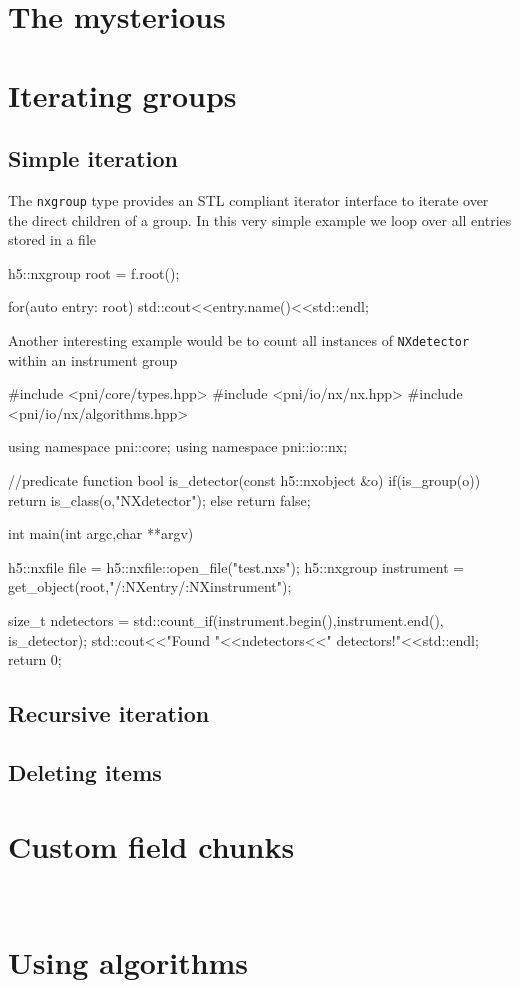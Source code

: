 \section{The mysterious \nxobject}\label{section:nxobject}

\section{Iterating groups}\label{section:group_iteration}

\subsection{Simple iteration}

The {\tt nxgroup} type provides an STL compliant iterator interface to iterate
over the direct children of a group. In this very simple example we loop over 
all entries stored in a file
\begin{cppcode}
h5::nxgroup root = f.root();

for(auto entry: root)
    std::cout<<entry.name()<<std::endl;
\end{cppcode}
Another interesting example would be to count all instances of {\tt NXdetector} 
within an instrument group
\begin{cppcode}
#include <pni/core/types.hpp>
#include <pni/io/nx/nx.hpp>
#include <pni/io/nx/algorithms.hpp>

using namespace pni::core;
using namespace pni::io::nx;

//predicate function
bool is_detector(const h5::nxobject &o)
{
    if(is_group(o)) return is_class(o,"NXdetector");
    else return false;
}

int main(int argc,char **argv)
{
    h5::nxfile file = h5::nxfile::open_file("test.nxs");
    h5::nxgroup instrument = get_object(root,"/:NXentry/:NXinstrument");

    size_t ndetectors = std::count_if(instrument.begin(),instrument.end(),
                                      is_detector);
    std::cout<<"Found "<<ndetectors<<" detectors!"<<std::endl;
    return 0;
}
\end{cppcode}

\subsection{Recursive iteration}

\subsection{Deleting items}


\section{Custom field chunks}\label{section:field_chunks}

\

\section{Using algorithms}



